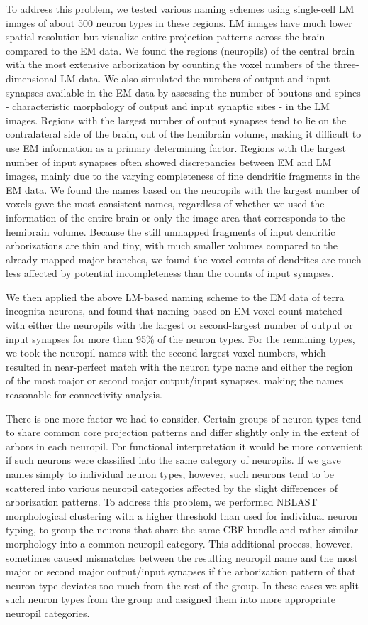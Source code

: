 \documentclass{article}
\begin{document}
To address this problem, we tested various naming schemes using single-cell LM images of about 500 neuron types in these regions. LM images have much lower spatial resolution but visualize entire projection patterns across the brain compared to the EM data. We found the regions (neuropils) of the central brain with the most extensive arborization by counting the voxel numbers of the three-dimensional LM data. We also simulated the numbers of output and input synapses available in the EM data by assessing the number of boutons and spines - characteristic morphology of output and input synaptic sites - in the LM images. Regions with the largest number of output synapses tend to lie on the contralateral side of the brain, out of the hemibrain volume, making it difficult to use EM information as a primary determining factor. Regions with the largest number of input synapses often showed discrepancies between EM and LM images, mainly due to the varying completeness of fine dendritic fragments in the EM data. We found the names based on the neuropils with the largest number of voxels gave the most consistent names, regardless of whether we used the information of the entire brain or only the image area that corresponds to the hemibrain volume. Because the still unmapped fragments of input dendritic arborizations are thin and tiny, with much smaller volumes compared to the already mapped major branches, we found the voxel counts of dendrites are much less affected by potential incompleteness than the counts of input synapses.

We then applied the above LM-based naming scheme to the EM data of terra incognita neurons, and found that naming based on EM voxel count matched with either the neuropils with the largest or second-largest number of output or input synapses for more than 95\% of the neuron types. For the remaining types, we took the neuropil names with the second largest voxel numbers, which resulted in near-perfect match with the neuron type name and either the region of the most major or second major output/input synapses, making the names reasonable for connectivity analysis.

There is one more factor we had to consider. Certain groups of neuron types tend to share common core projection patterns and differ slightly only in the extent of arbors in each neuropil. For functional interpretation it would be more convenient if such neurons were classified into the same category of neuropils. If we gave names simply to individual neuron types, however, such neurons tend to be scattered into various neuropil categories affected by the slight differences of arborization patterns. To address this problem, we performed NBLAST morphological clustering with a higher threshold than used for individual neuron typing, to group the neurons that share the same CBF bundle and rather similar morphology into a common neuropil category. This additional process, however, sometimes caused mismatches between the resulting neuropil name and the most major or second major output/input synapses if the arborization pattern of that neuron type deviates too much from the rest of the group. In these cases we split such neuron types from the group and assigned them into more appropriate neuropil categories.
\end{document}
